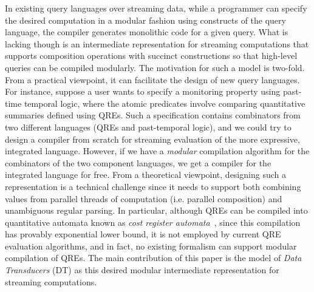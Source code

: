 In existing query languages over streaming data, while a programmer can specify the desired computation
in a modular fashion using constructs of the query language, the compiler generates monolithic code for
a given query.
What is lacking though is an intermediate representation for streaming computations
that supports composition operations with succinct constructions so that high-level queries can be
compiled modularly. The motivation for such a model is two-fold. From a practical viewpoint,
it can facilitate the design of new query languages. For instance, suppose a user wants
to specify a monitoring property using past-time temporal logic, where the atomic
predicates involve comparing quantitative summaries defined using QREs.
Such a specification contains combinators from two different languages (QREs and past-temporal logic), and we could try to design a compiler from scratch for streaming evaluation of the more expressive, integrated language.
However, if we have a \emph{modular} compilation algorithm for the combinators of the two component languages, we get a compiler for the integrated language for free.
From a theoretical viewpoint, designing such a representation is a technical challenge since
it needs to support both combining values from parallel threads of computation (i.e. parallel composition) and unambiguous regular parsing.
In particular, although QREs can be compiled into quantitative automata known
as \emph{cost register automata}~\cite{AdADRY2013CRA}, since this compilation has provably exponential lower bound,
it is not employed by current QRE evaluation algorithms, and in fact, no existing formalism can support
modular compilation of QREs.
The main contribution of this paper is the model of \emph{Data Transducers} (DT) as this desired
modular intermediate representation for streaming computations.

